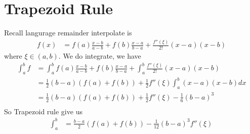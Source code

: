 \documentclass[11pt,oneside]{book}
\theoremstyle{break}
\theoremstyle{break}
\begin{document}
\section[Trapezoid Rule]{Trapezoid Rule}
Recall langurage remainder interpolate is \begin{align*}
f(x)&=f(a)\frac{x-b}{a-b}+f(b)\frac{x-a}{b-a}+\frac{f''(\xi)}{2!}(x-a)(x-b)
\end{align*}
where $\xi\in (a,b)$. We do integrate, we have \begin{align*}
\int_{a}^{b}f&=\int_{a}^{b}f(a)\frac{x-b}{a-b}+f(b)\frac{x-a}{b-a}+\int_{a}^{b}\frac{f''(\xi)}{2!}(x-a)(x-b)\\
&=\frac{1}{2}(b-a)(f(a)+f(b))+\frac{1}{2}f''(\xi)\int_{a}^b(x-a)(x-b)dx\\
&=\frac{1}{2}(b-a)(f(a)+f(b))+\frac{1}{2}f''(\xi)-\frac{1}{6}(b-a)^3\\
\end{align*}
So Trapezoid rule give us \begin{align*}
\int_{a}^{b}&=\frac{b-a}{2}(f(a)+f(b))-\frac{1}{12}(b-a)^3f''(\xi)
\end{align*}
\end{document}

